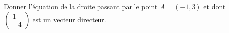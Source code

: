 
\begin{exercice}\label{exosmath-0344}

    Donner l'équation de la droite passant par le point \( A=(-1,3)\) et dont \( \begin{pmatrix}
        1    \\ 
        -4    
    \end{pmatrix}\) est un vecteur directeur.

\end{exercice}
